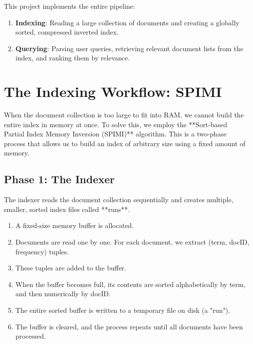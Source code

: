 \documentclass[11pt, a4paper]{report}
\begin{document}
This project implements the entire pipeline:
\begin{enumerate}
    \item \textbf{Indexing}: Reading a large collection of documents and creating a globally sorted, compressed inverted index.
    \item \textbf{Querying}: Parsing user queries, retrieving relevant document lists from the index, and ranking them by relevance.
\end{enumerate}

\section{The Indexing Workflow: SPIMI}
When the document collection is too large to fit into RAM, we cannot build the entire index in memory at once. To solve this, we employ the **Sort-based Partial Index Memory Inversion (SPIMI)** algorithm. This is a two-phase process that allows us to build an index of arbitrary size using a fixed amount of memory.

\subsection{Phase 1: The Indexer}
The indexer reads the document collection sequentially and creates multiple, smaller, sorted index files called **runs**.
\begin{enumerate}
    \item A fixed-size memory buffer is allocated.
    \item Documents are read one by one. For each document, we extract (term, docID, frequency) tuples.
    \item These tuples are added to the buffer.
    \item When the buffer becomes full, its contents are sorted alphabetically by term, and then numerically by docID.
    \item The entire sorted buffer is written to a temporary file on disk (a "run").
    \item The buffer is cleared, and the process repeats until all documents have been processed.
\end{enumerate}
\end{document}
